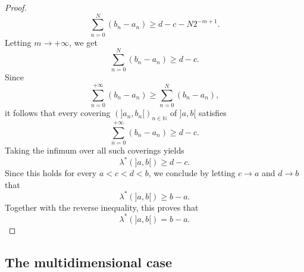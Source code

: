 \begin{proof}
		\[
			\sum_{n=0}^{N}(b_n-a_n)\ge d-c-N2^{-m+1}.
		\]
		Letting $m\to+\infty$, we get
		\[
			\sum_{n=0}^{N}(b_n-a_n)\ge d-c.
		\]
		Since
		\[
			\sum_{n=0}^{+\infty}(b_n-a_n)\ge \sum_{n=0}^{N}(b_n-a_n),
		\]
		it follows that every covering $(]a_n,b_n[)_{n\in\mathbb{N}}$ of $]a,b[$ satisfies
		\[
			\sum_{n=0}^{+\infty}(b_n-a_n)\ge d-c.
		\]
		Taking the infimum over all such coverings yields
		\[
			\lambda^*(]a,b[)\ge d-c.
		\]
		Since this holds for every $a<c<d<b$, we conclude by letting $c\to a$ and $d\to b$ that
	\[
		\lambda^*(]a,b[)\ge b-a.
	\]
	Together with the reverse inequality, this proves that
	\[
		\lambda^*(]a,b[)=b-a.
	\]
\end{proof}

\subsection{The multidimensional case}
